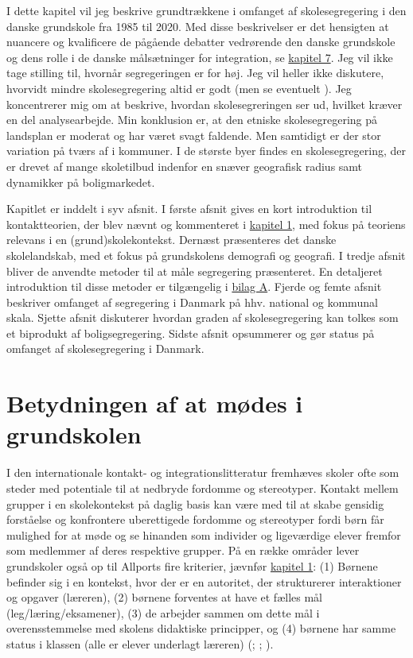 \documentclass[
]{book}
\begin{document}
I dette kapitel vil jeg beskrive grundtrækkene i omfanget af skolesegregering i den danske grundskole fra 1985 til 2020. Med disse beskrivelser er det hensigten at nuancere og kvalificere de pågående debatter vedrørende den danske grundskole og dens rolle i de danske målsætninger for integration, se \hyperref[kap7]{kapitel 7}. Jeg vil ikke tage stilling til, hvornår segregeringen er for høj. Jeg vil heller ikke diskutere, hvorvidt mindre skolesegregering altid er godt (men se eventuelt ). Jeg koncentrerer mig om at beskrive, hvordan skolesegreringen ser ud, hvilket kræver en del analysearbejde. Min konklusion er, at den etniske skolesegregering på landsplan er moderat og har været svagt faldende. Men samtidigt er der stor variation på tværs af i kommuner. I de største byer findes en skolesegregering, der er drevet af mange skoletilbud indenfor en snæver geografisk radius samt dynamikker på boligmarkedet.

Kapitlet er inddelt i syv afsnit. I første afsnit gives en kort introduktion til kontaktteorien, der blev nævnt og kommenteret i \hyperref[kap1]{kapitel 1}, med fokus på teoriens relevans i en (grund)skolekontekst. Dernæst præsenteres det danske skolelandskab, med et fokus på grundskolens demografi og geografi. I tredje afsnit bliver de anvendte metoder til at måle segregering præsenteret. En detaljeret introduktion til disse metoder er tilgængelig i \hyperref[bilag1]{bilag A}. Fjerde og femte afsnit beskriver omfanget af segregering i Danmark på hhv. national og kommunal skala. Sjette afsnit diskuterer hvordan graden af skolesegregering kan tolkes som et biprodukt af boligsegregering. Sidste afsnit opsummerer og gør status på omfanget af skolesegregering i Danmark.

\section{Betydningen af at mødes i grundskolen}\label{betydningen-af-at-muxf8des-i-grundskolen}

I den internationale kontakt- og integrationslitteratur fremhæves skoler ofte som steder med potentiale til at nedbryde fordomme og stereotyper. Kontakt mellem grupper i en skolekontekst på daglig basis kan være med til at skabe gensidig forståelse og konfrontere uberettigede fordomme og stereotyper fordi børn får mulighed for at møde og se hinanden som individer og ligeværdige elever fremfor som medlemmer af deres respektive grupper. På en række områder lever grundskoler også op til Allports fire kriterier, jævnfør \hyperref[kap1]{kapitel 1}: (1) Børnene befinder sig i en kontekst, hvor der er en autoritet, der strukturerer interaktioner og opgaver (læreren), (2) børnene forventes at have et fælles mål (leg/læring/eksamener), (3) de arbejder sammen om dette mål i overensstemmelse med skolens didaktiske principper, og (4) børnene har samme status i klassen (alle er elever underlagt læreren) (; ; ).
\end{document}
